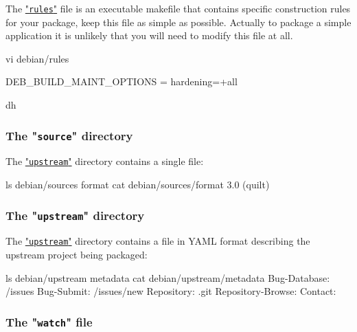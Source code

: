 The \href{https://www.debian.org/doc/debian-policy/ch-source.html#main-building-script-debian-rules}{"\texttt{rules}"} file is an executable makefile 
that contains specific construction rules for your package, keep this file as simple as possible. 
Actually to package a simple application it is unlikely that you will need to modify this file at all. 
{\footnotesize{
\begin{script}
 vi debian/rules


 DEB\_BUILD\_MAINT\_OPTIONS = hardening=+all

\var{\%:}
\qquad\qquad dh 
\end{script}
}}

\subsubsection{The "\texttt{source}" directory}

The \href{https://wiki.debian.org/debian/upstream}{"\texttt{upstream}"}  directory contains a single file: 
{\footnotesize{
\begin{script}
 ls debian/sources
format
 cat debian/sources/format
3.0 (quilt)
\end{script}
}}

\subsubsection{The "\texttt{upstream}" directory}

The \href{https://wiki.debian.org/debian/upstream}{"\texttt{upstream}"} directory contains a file in YAML format describing the upstream project being packaged:
{\footnotesize{
\begin{script}
 ls debian/upstream
metadata
 cat debian/upstream/metadata
Bug-Database: \gitprog/issues
Bug-Submit: \gitprog/issues/new
Repository: \gitprog.git
Repository-Browse: \gitprog
Contact: \email
{}
\end{script}
}}

\subsubsection{The "\texttt{watch}" file}

